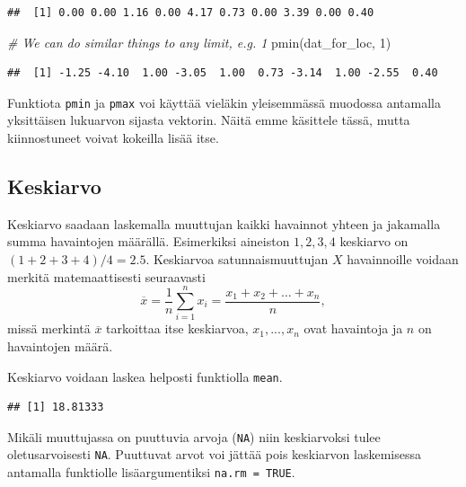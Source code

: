 \documentclass[
]{book}
\newenvironment{Shaded}{\begin{snugshade}}{\end{snugshade}}
\newcommand{\CommentTok}[1]{\textcolor[rgb]{0.56,0.35,0.01}{\textit{#1}}}
\newcommand{\DecValTok}[1]{\textcolor[rgb]{0.00,0.00,0.81}{#1}}
\newcommand{\FunctionTok}[1]{\textcolor[rgb]{0.00,0.00,0.00}{#1}}
\newcommand{\NormalTok}[1]{#1}
\newcommand{\OtherTok}[1]{\textcolor[rgb]{0.56,0.35,0.01}{#1}}
\newcommand{\SpecialCharTok}[1]{\textcolor[rgb]{0.00,0.00,0.00}{#1}}
\begin{document}
\begin{verbatim}
##  [1] 0.00 0.00 1.16 0.00 4.17 0.73 0.00 3.39 0.00 0.40
\end{verbatim}

\begin{Shaded}
\begin{Highlighting}[]
\CommentTok{\# We can do similar things to any limit, e.g. 1}
\FunctionTok{pmin}\NormalTok{(dat\_for\_loc, }\DecValTok{1}\NormalTok{)}
\end{Highlighting}
\end{Shaded}

\begin{verbatim}
##  [1] -1.25 -4.10  1.00 -3.05  1.00  0.73 -3.14  1.00 -2.55  0.40
\end{verbatim}

Funktiota \texttt{pmin} ja \texttt{pmax} voi käyttää vieläkin yleisemmässä muodossa antamalla yksittäisen lukuarvon sijasta vektorin. Näitä emme käsittele tässä, mutta kiinnostuneet voivat kokeilla lisää itse.

\hypertarget{keskiarvo}{%
\subsection{Keskiarvo}\label{keskiarvo}}

Keskiarvo saadaan laskemalla muuttujan kaikki havainnot yhteen ja jakamalla summa havaintojen määrällä. Esimerkiksi aineiston \(1,2,3,4\) keskiarvo on \((1+2+3+4)/4 = 2.5\). Keskiarvoa satunnaismuuttujan \(X\) havainnoille voidaan merkitä matemaattisesti seuraavasti
\[\overline{x} = \frac1n \sum_{i=1}^n x_i = \frac{x_1+x_2+\dots+x_n}{n},\]
missä merkintä \(\overline{x}\) tarkoittaa itse keskiarvoa, \(x_1,...,x_n\) ovat havaintoja ja \(n\) on havaintojen määrä.

Keskiarvo voidaan laskea helposti funktiolla \texttt{mean}.

\begin{Shaded}
\end{Shaded}

\begin{verbatim}
## [1] 18.81333
\end{verbatim}

Mikäli muuttujassa on puuttuvia arvoja (\texttt{NA}) niin keskiarvoksi tulee oletusarvoisesti \texttt{NA}. Puuttuvat arvot voi jättää pois keskiarvon laskemisessa antamalla funktiolle lisäargumentiksi \texttt{na.rm\ =\ TRUE}.
\end{document}

